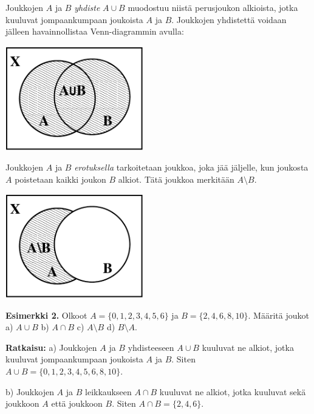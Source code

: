 
Joukkojen $A$ ja $B$ {\em yhdiste} $A\cup B$ muodostuu niistä perusjoukon alkioista, jotka kuuluvat jompaankumpaan joukoista $A$ ja $B$. 
Joukkojen yhdistettä voidaan jälleen havainnollistaa Venn-diagrammin avulla:

\begin{center}
\includegraphics[width=6cm]{kuvat/yhdiste}
\end{center}



Joukkojen $A$ ja $B$ {\em erotuksella} tarkoitetaan joukkoa, joka jää jäljelle, kun joukosta $A$ poistetaan kaikki joukon $B$ alkiot. Tätä joukkoa merkitään $A\setminus B$. 

\begin{center}
\includegraphics[width=6cm]{kuvat/erotus}
\end{center}


{\bf Esimerkki 2.}
Olkoot $A = \{0, 1, 2, 3, 4, 5, 6\}$ ja $B = \{2, 4, 6, 8, 10\}$. Määritä joukot a) $A\cup B$ b) $A \cap B$ c) $A\setminus B$ d) $B \setminus A$.

{\bf Ratkaisu:} 
a) Joukkojen $A$ ja $B$ yhdisteeseen $A \cup B$ kuuluvat ne alkiot, jotka kuuluvat jompaankumpaan joukoista $A$ ja $B$. Siten $A\cup B = \{0, 1, 2, 3, 4, 5, 6, 8, 10\}$.

b) Joukkojen $A$ ja $B$ leikkaukseen $A \cap B$ kuuluvat ne alkiot, jotka kuuluvat sekä joukkoon $A$ että joukkoon $B$. Siten $A \cap B = \{2, 4, 6\}$.

